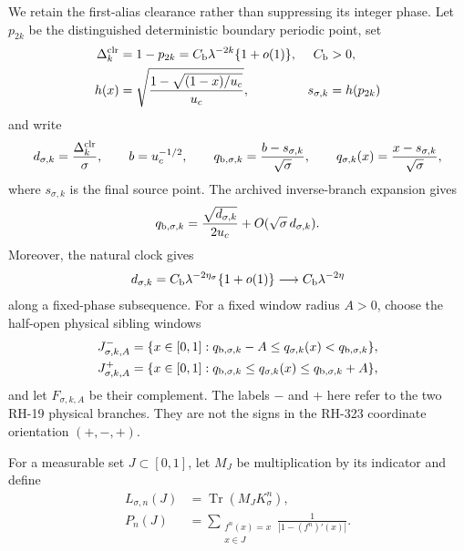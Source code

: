\documentclass[11pt]{article}
\theoremstyle{remark}
\newcommand{\Tr}{\operatorname{Tr}}
\begin{document}
We retain the first-alias clearance rather than suppressing its integer
phase.  Let $p_{2k}$ be the distinguished deterministic boundary periodic
point, set
\begin{align}
 \Delta_k^{\rm clr}
 &=1-p_{2k}=C_{\rm b}\lambda^{-2k}\{1+o(1)\},
 & C_{\rm b}&>0,
 \label{eq:clearance-source}
 \\
 h(x)&=\sqrt{\frac{1-\sqrt{(1-x)/u_c}}{u_c}},
 & s_{\sigma,k}&=h(p_{2k})
\end{align}
and write
\begin{equation}
 d_{\sigma,k}=\frac{\Delta_k^{\rm clr}}\sigma,
 \qquad
 b=u_c^{-1/2},
 \qquad
 q_{{\rm b},\sigma,k}=\frac{b-s_{\sigma,k}}{\sqrt\sigma},
 \qquad
 q_{\sigma,k}(x)=\frac{x-s_{\sigma,k}}{\sqrt\sigma},
 \label{eq:sibling-coordinates}
\end{equation}
where $s_{\sigma,k}$ is the final source point.  The archived inverse-branch
expansion gives
\begin{equation}
 q_{{\rm b},\sigma,k}
 =\frac{\sqrt{d_{\sigma,k}}}{2u_c}
  +O(\sqrt\sigma\,d_{\sigma,k}).
 \label{eq:partition-asymptotic}
\end{equation}
Moreover, the natural clock gives
\begin{equation}
 d_{\sigma,k}=C_{\rm b}\lambda^{-2\eta_\sigma}\{1+o(1)\}
 \longrightarrow C_{\rm b}\lambda^{-2\eta}
 \label{eq:clearance-phase}
\end{equation}
along a fixed-phase subsequence.
For a fixed window radius $A>0$, choose the half-open physical sibling
windows
\begin{align}
 J^-_{\sigma,k,A}
 &=\{x\in[0,1]:q_{{\rm b},\sigma,k}-A
     \le q_{\sigma,k}(x)<q_{{\rm b},\sigma,k}\},
 \label{eq:left-window}\\
 J^+_{\sigma,k,A}
 &=\{x\in[0,1]:q_{{\rm b},\sigma,k}
     \le q_{\sigma,k}(x)\le q_{{\rm b},\sigma,k}+A\},
 \label{eq:right-window}
\end{align}
and let $F_{\sigma,k,A}$ be their complement.  The labels $-$ and $+$ here
refer to the two RH-19 physical branches.  They are not the signs in the
RH-323 coordinate orientation $(+,-,+)$.

For a measurable set $J\subset[0,1]$, let $M_J$ be multiplication by its
indicator and define
\begin{align}
 L_{\sigma,n}(J)&=\Tr(M_JK_\sigma^n),
 \label{eq:localized-noisy}\\
 P_n(J)&=\sum_{\substack{f^n(x)=x\\x\in J}}
       \frac1{|1-(f^n)'(x)|}.
 \label{eq:localized-flat}
\end{align}
\end{document}
